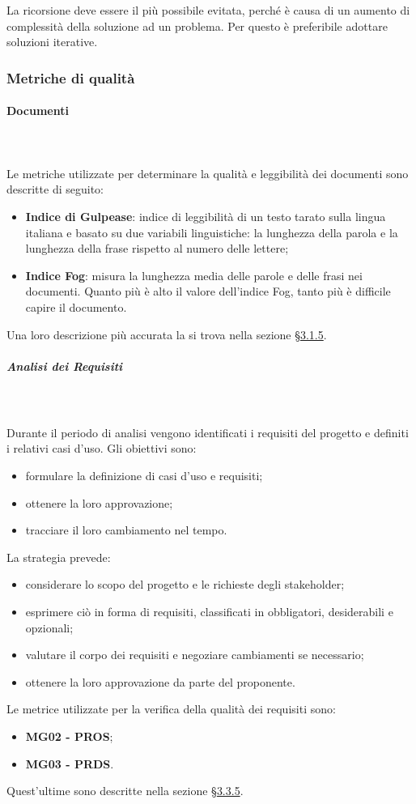 		 \mbox{} \\ \mbox{} \\
		La ricorsione deve essere il più possibile evitata, perché è causa di un aumento di complessità della soluzione ad un problema. Per questo è preferibile adottare soluzioni iterative.
	\subsubsection{Metriche di qualità}
			\paragraph{Documenti}\mbox{} \\ \mbox{} \\
			Le metriche utilizzate per determinare la qualità e leggibilità dei documenti sono descritte di seguito:
			 \begin{itemize}
			\item \textbf{Indice di Gulpease}: indice di leggibilità di un testo tarato sulla lingua italiana e basato su due variabili linguistiche: la lunghezza della parola e la lunghezza della frase rispetto al numero delle lettere;
			\item \textbf{Indice Fog}: misura la lunghezza media delle parole e delle frasi nei documenti. Quanto più è alto il valore dell'indice Fog, tanto più è difficile capire il documento.
			\end{itemize}
			Una loro descrizione più accurata la si trova nella sezione \S \hyperref[par:metricheDoc]{3.1.5}.
			\subparagraph*{Analisi dei Requisiti} \mbox{} \\ \mbox{} \\
			Durante il periodo di analisi vengono identificati i requisiti del progetto e definiti i relativi casi d'uso. 
			Gli obiettivi sono:
			\begin{itemize}
			\item  formulare la definizione di casi d'uso e requisiti;
			\item ottenere la loro approvazione;
			\item tracciare il loro cambiamento nel tempo.
			\end{itemize}
			La strategia prevede:
			\begin{itemize}
			\item considerare lo scopo del progetto e le richieste degli stakeholder;
			\item esprimere ciò in forma di requisiti, classificati in obbligatori, desiderabili e opzionali;
			\item valutare il corpo dei requisiti e negoziare cambiamenti se necessario;
			\item ottenere la loro approvazione da parte del proponente.
			\end{itemize}
			Le metrice utilizzate per la verifica della qualità dei requisiti sono: \begin{itemize}
			\item \textbf{MG02 - PROS};
			\item \textbf{MG03 - PRDS}.
\end{itemize}			 
Quest'ultime sono descritte nella sezione \S \hyperref[par:metricheGen]{3.3.5}.
